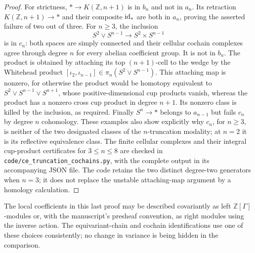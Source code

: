 \begin{proof}
For strictness, $*\to K(\mathbb Z,n+1)$ is in $b_n$ and
not in $a_n$. Its retraction $K(\mathbb Z,n+1)\to*$ and
their composite $\mathrm{id}_*$ are both in $a_n$, proving the
asserted failure of two out of three. For $n\geq3$, the inclusion
\[
 S^2\vee S^{n-1}\longrightarrow S^2\times S^{n-1}
\]
is in $c_n$: both spaces are simply connected and their
cellular cochain complexes agree through degree $n$ for
every abelian coefficient group. It is not in $b_n$.
The product is obtained by attaching its top $(n+1)$-cell
to the wedge by the Whitehead product
$[\iota_2,\iota_{n-1}]\in\pi_n(S^2\vee S^{n-1})$.
This attaching map is nonzero, for otherwise the product
would be homotopy equivalent to
$S^2\vee S^{n-1}\vee S^{n+1}$, whose positive-dimensional
cup products vanish, whereas the product has a nonzero
cross cup product in degree $n+1$. Its nonzero class is
killed by the inclusion, as required. Finally
$S^n\to*$ belongs to $a_{n-1}$ but fails $c_n$ by degree
$n$ cohomology. These examples also show explicitly why
$c_n$, for $n\geq3$, is neither of the two designated classes
of the $n$-truncation modality; at $n=2$ it is its reflective
equivalence class.
The finite cellular complexes and their integral cup-product
certificates for $3\leq n\leq8$ are checked in
\texttt{code/ce\_truncation\_cochains.py}, with the complete
output in its accompanying JSON file. The code retains the
two distinct degree-two generators when $n=3$; it does not
replace the unstable attaching-map argument by a homology
calculation.
\end{proof}

The local coefficients in this last proof may be described
covariantly as left $\mathbb Z[\Gamma]$-modules or, with
the manuscript's presheaf convention, as right modules
using the inverse action. The equivariant-chain and
cochain identifications use one of these choices consistently;
no change in variance is being hidden in the comparison.
